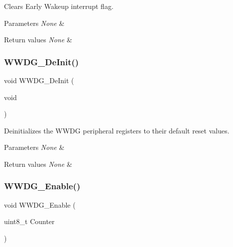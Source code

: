 Clears Early Wakeup interrupt flag. 


\begin{DoxyParams}{Parameters}
{\em None} & \\
\hline
\end{DoxyParams}

\begin{DoxyRetVals}{Return values}
{\em None} & \\
\hline
\end{DoxyRetVals}
\mbox{\label{group___w_w_d_g___exported___functions_ga7130f4dc861b9234b62e73f9f57f89a1}} 
\subsubsection{\texorpdfstring{WWDG\_DeInit()}{WWDG\_DeInit()}}
{\footnotesize\ttfamily void W\+W\+D\+G\+\_\+\+De\+Init (\begin{DoxyParamCaption}\item[{void}]{ }\end{DoxyParamCaption})}



Deinitializes the W\+W\+DG peripheral registers to their default reset values. 


\begin{DoxyParams}{Parameters}
{\em None} & \\
\hline
\end{DoxyParams}

\begin{DoxyRetVals}{Return values}
{\em None} & \\
\hline
\end{DoxyRetVals}
\mbox{\label{group___w_w_d_g___exported___functions_ga10dc2554d0b504b5472e3ecf0f02a9e6}} 
\subsubsection{\texorpdfstring{WWDG\_Enable()}{WWDG\_Enable()}}
{\footnotesize\ttfamily void W\+W\+D\+G\+\_\+\+Enable (\begin{DoxyParamCaption}\item[{uint8\+\_\+t}]{Counter }\end{DoxyParamCaption})}



